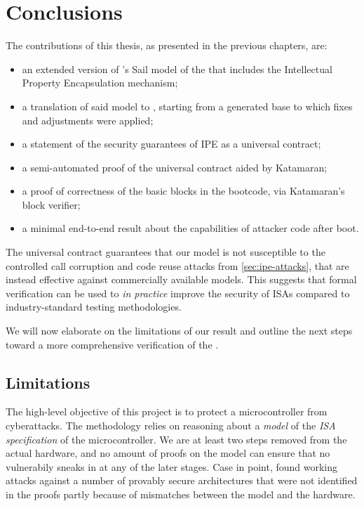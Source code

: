 \chapter{Conclusions}
\label{ch:conclusions}

The contributions of this thesis, as presented in the previous chapters, are:
\begin{itemize}
\item an extended version of \cite{mspthesis}'s Sail model of the \msp that includes the Intellectual Property Encapsulation mechanism;
\item a translation of said model to \usail, starting from a generated base to which fixes and adjustments were applied;
\item a statement of the security guarantees of IPE as a universal contract;
\item a semi-automated proof of the universal contract aided by Katamaran;
\item a proof of correctness of the basic blocks in the \msp bootcode, via Katamaran's block verifier;
\item a minimal end-to-end result about the capabilities of attacker code after boot.
\end{itemize}

The universal contract guarantees that our model is not susceptible to the controlled call corruption and code reuse attacks from \cref{sec:ipe-attacks}, that are instead effective against commercially available \msp models. This suggests that formal verification can be used to \emph{in practice} improve the security of ISAs compared to industry-standard testing methodologies. %

We will now elaborate on the limitations of our result and outline the next steps toward a more comprehensive verification of the \msp.

\section{Limitations}


The high-level objective of this project is to protect a microcontroller from cyberattacks. The methodology relies on reasoning about a \emph{model} of the \emph{ISA specification} of the microcontroller. We are at least two steps removed from the actual hardware, and no amount of proofs on the model can ensure that no vulnerabily sneaks in at any of the later stages. Case in point, \cite{Bognar2022} found working attacks against a number of provably secure architectures that were not identified in the proofs partly because of mismatches between the model and the hardware.

